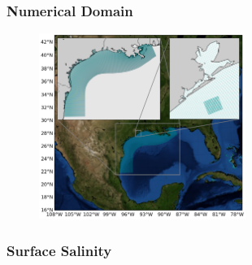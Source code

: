 \documentclass[ignorenonframetext]{beamer}
\begin{document}

\begin{frame}[t]\frametitle{Numerical Domain}
	\begin{figure}[htbp]
		\centering
		\includegraphics[width=0.6\textwidth]{figures/TXLA_domain.png}
	\end{figure}
\end{frame}


\begin{frame}[t]\frametitle{Surface Salinity}
	\begin{figure}
	  	\centering
	\end{figure}
\end{frame}
\end{document}
